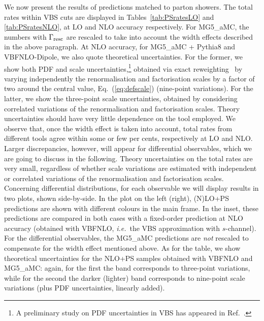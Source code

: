 \documentclass[twocolumn,epjc3]{svjour3} %
\newlength{\width}
\begin{document}
We now present the results of predictions matched to parton showers.
The total rates within VBS cuts are displayed in Tables~\ref{tab:PSratesLO} and
\ref{tab:PSratesNLO}, at LO and NLO
accuracy respectively. For {\sc MG5\_aMC},
the numbers with $\Gamma_{\rm resc}$ are rescaled to
take into account the width effects described in the above paragraph. At NLO accuracy, for {\sc MG5\_aMC} + {\sc Pythia8} and {\sc VBFNLO}-{\sc Dipole}, we also quote
theoretical uncertainties.
For the former, we show both PDF and scale uncertainties,\footnote{A preliminary study on PDF uncertainties in VBS has appeared
in Ref.~\cite{Schwan:2017yy}.} obtained via exact reweighting~\cite{Frederix:2011ss} by varying independently the renormalisation and factorisation
scales by a factor of two around the central value, Eq.~(\ref{eq:defscale}) (nine-point variations).
For the latter, we show the
three-point scale uncertainties, obtained by considering correlated variations of the renormalisation and factorisation scales. Theory uncertainties should have very little dependence on the tool employed.
We observe that, once the width effect is taken into
account, total rates from different tools agree within some or few per cents, respectively at LO and NLO. Larger discrepancies, however, will appear for differential observables, which we are going to discuss in
the following. Theory uncertainties on the total rates are very small, regardless of whether scale variations are estimated with 
independent or correlated variations of the renormalisation and factorisation scales.
Concerning differential distributions, for each observable we will display results in two plots, shown side-by-side. In the plot on the left (right), (N)LO+PS predictions are shown
with different colours in the main frame. In the inset, these predictions are compared in both cases with a fixed-order prediction at NLO accuracy (obtained with
{\sc VBFNLO}, \emph{i.e.}\ the VBS approximation with $s$-channel).
For the differential observables, the {\sc MG5\_aMC} predictions are \emph{not} rescaled to compensate for the width effect mentioned above. As for the table, we show theoretical uncertainties for the NLO+PS samples
obtained with {\sc VBFNLO} and {\sc MG5\_aMC}:
again, for the first the band corresponds to three-point variations, while for the second the darker (lighter) band corresponds to nine-point
scale variations (plus PDF uncertainties, linearly added).
\end{document}
